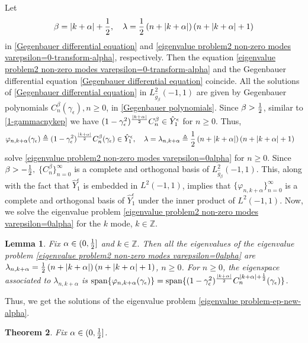 \documentclass[1 [leqno, 11pt]{amsart}
\numberwithin{equation}{section}
\let\ep=\epsilon
\newtheorem{Theorem}{Theorem}[section]
\newtheorem{lemma}[Theorem]{Lemma}
\begin{document}
\begin{CJK*}{GBK}{song}
Let
\begin{align*}
\beta=|k+\alpha|+{1\over2},\quad \lambda={1\over2}\left(n+|k+\alpha|\right)\left(n+|k+\alpha| +1\right)
\end{align*}
in \eqref{Gegenbauer differential equation} and \eqref{eigenvalue problem2 non-zero modes varepsilon=0-transform-alpha}, respectively.
Then the  equation \eqref{eigenvalue problem2 non-zero modes varepsilon=0-transform-alpha} and  the Gegenbauer differential equation \eqref{Gegenbauer differential equation} coincide. All the solutions of  \eqref{Gegenbauer differential equation} in $ L_{\hat g_\beta}^2(-1,1)$ are given by
Gegenbauer polynomials
$
C_n^\beta(\gamma_\ep), n\geq0$, in \eqref{Gegenbauer polynomials}. Since $\beta>{1\over2}$,  similar to \eqref{1-gammacnykep} we have $(1-\gamma_\ep^2)^{|k+\alpha|\over2}C_n^\beta\in\hat Y_1^\ep$ for $n\geq0$.
Thus,
\begin{align*}
&\varphi_{n,k+\alpha}(\gamma_\ep)\triangleq(1-\gamma_\ep^2)^{|k+\alpha|\over2}C_n^\beta(\gamma_\ep)\in\hat Y_1^\ep,\quad\lambda=\lambda_{n,k+\alpha}\triangleq{1\over2}\left(n+|k+\alpha|\right)\left(n+|k+\alpha| +1\right)
\end{align*}
solve \eqref{eigenvalue problem2 non-zero modes varepsilon=0alpha} for $n\geq0$.
Since $\beta>-{1\over2},$ $\{C_n^\beta\}_{n=0}^\infty$ is a complete and  orthogonal basis of $ L_{\hat g_\beta}^2(-1,1)$. This, along with the fact that   $\hat Y_1^\ep$ is embedded in $ L^2(-1,1)$, implies that
 $\{\varphi_{n,k+\alpha}\}_{n=0}^\infty$ is a complete and  orthogonal basis of $\hat Y_1^\ep$ under the inner product of $ L^2(-1,1)$.
Now, we solve the eigenvalue problem \eqref{eigenvalue problem2 non-zero modes varepsilon=0alpha} for the $k$ mode, $k\in\mathbb{Z}$.
\begin{lemma}\label{sol to eigenvalue problem non-zero modes varepsilon=0-alpha-k} Fix $\alpha\in(0,{1\over2}]$ and $k\in\mathbb{Z}.$ Then
all the eigenvalues  of the eigenvalue problem \eqref{eigenvalue problem2 non-zero modes varepsilon=0alpha}  are $\lambda_{n,k+\alpha}={1\over2}\left(n+|k+\alpha|\right)\left(n+|k+\alpha| +1\right)$, $n\geq 0$. For $n\geq0$, the eigenspace associated to $\lambda_{n,{k+\alpha}}$ is $\text{span}\{\varphi_{n,k+\alpha}(\gamma_\ep)\}=\text{span}\{(1-\gamma_\ep^2)^{|k+\alpha|\over2}C_n^{|k+\alpha|+{1\over2}}(\gamma_\ep)\}$.
\end{lemma}

Thus, we get the solutions of
the eigenvalue problem \eqref{eigenvalue problem-ep-new-alpha}.
\begin{Theorem}\label{sol to eigenvalue problem varepsilon=0-pde-alpha} Fix $\alpha\in(0,{1\over2}]$.


\end{Theorem}
\end{CJK*}
\end{document}
